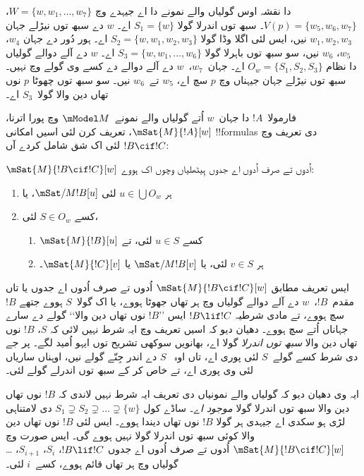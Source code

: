 \documentclass[../../../include/open-logic-section]{subfiles}
\begin{document}
 دا نقشہ اوس گولیاں والے نمونے دا اے جیہدے وچ
$W = \{w, w_1, \dots, w_7\}$، $V(p) = \{w_5, w_6, w_7\}$۔ سبھ توں
اندرلا گولا $S_1 = \{w\}$ اے۔ $w$ دے سبھ توں نیڑلے جہان $w_1, w_2, w_3$
نیں، ایس لئی اگلا وڈا گولا $S_2 = \{w, w_1, w_2, w_3\}$ اے۔ ہور
دُور دے جہان $w_4$، $w_5$، $w_6$ نیں، سو سبھ توں باہرلا گولا
$S_3 = \{w, w_1, \dots, w_6\}$ اے۔ $w$ دے آلے دوالے گولیاں دا نظام
$O_w = \{S_1, S_2, S_3\}$ اے۔ جہان~$w_7$،~$w$ دے آلے دوالے دے کسے
وی گولے وچ نہیں۔ سبھ توں نیڑلے جہان جیہناں وچ $p$ سچ اے، $w_5$ تے~$w_6$
نیں۔ سو سبھ توں چھوٹا $p$ نوں تھاں دین والا گولا~$S_3$ اے۔

فارمولا~$!A$ دا جہان~$w$ اُتے گولیاں والے نمونے~$\mModel M$ وچ پورا
اترنا، $\mSat{M}{!A}[w]$، تعریف کرن لئی اسیں امکانی !!{formula}s دی تعریف
وچ $!B \cif !C$ لئی اک شق شامل کردے آں:

\begin{defn}
  $\mSat{M}{!B \cif !C}[w]$ اُدوں تے صرف اُدوں اے جدوں ہِیٹھلیاں وچوں اک ہووے:
  \begin{enumerate}
  \item{} ہر $u \in \bigcup O_w$ لئی $\mSat/{M}{!B}[u]$، یا
  \item{} کسے $S \in O_w$ لئی،
    \begin{enumerate}
      \item $\mSat{M}{!B}[u]$ کسے $u \in S$ لئی، تے
      \item ہر $v \in S$ لئی، یا $\mSat/{M}{!B}[v]$ یا $\mSat{M}{!C}[v]$۔
    \end{enumerate}
  \end{enumerate}
\end{defn}

ایس تعریف مطابق $\mSat{M}{!B \cif !C}[w]$ اُدوں تے صرف اُدوں اے جدوں
یا تاں مقدم~$!B$،~$w$ دے آلے دوالے گولیاں وچ ہر تھاں جھوٹا ہووے، یا اک
گولا~$S$ ہووے جتھے $!B$ سچ ہووے، تے مادی شرطیہ $!B \lif !C$ ایس
’’$!B$ نوں تھاں دین والا‘‘ گولے دے سارے جہاناں اُتے سچ ہووے۔ دھیان دیو کہ
اسیں تعریف وچ ایہ شرط نہیں لائی کہ $S$، $!B$ نوں تھاں دین والا
\emph{سبھ توں اندرلا} گولا اے، بھانویں سوکھی تشریح توں ایہو اُمید لگے۔
پر جے  دی شرط کسے گولے~$S$ لئی پوری اے، تاں اوہ
~$S$ دے اندر جِنّے گولے نیں، اوہناں ساریاں لئی وی پوری اے، تے خاص کر کے سبھ توں
اندرلے گولے لئی۔

ایہ وی دھیان دیو کہ گولیاں والے نمونیاں دی تعریف ایہ شرط نہیں لاندی کہ
$!B$ نوں تھاں دین والا سبھ توں اندرلا گولا \emph{موجود اے}۔ ساڈے کول
$S_1 \supsetneq S_2 \supsetneq \dots \supsetneq \{w\}$ دی لامتناہی لڑی
ہو سکدی اے جیہدی ہر گولا $!B$ نوں تھاں دیندا ہووے۔ ایس لئی $!B$ نوں
تھاں دین والا کوئی سبھ توں اندرلا گولا نہیں ہووے گی۔ ایس صورت وچ
$\mSat{M}{!B \cif !C}[w]$ اُدوں تے صرف اُدوں اے جدوں
$!B \lif !C$، $S_i$، $S_{i+1}$، \dots گولیاں وچ ہر تھاں قائم ہووے،
کسے~$i$ لئی۔
\end{document}
